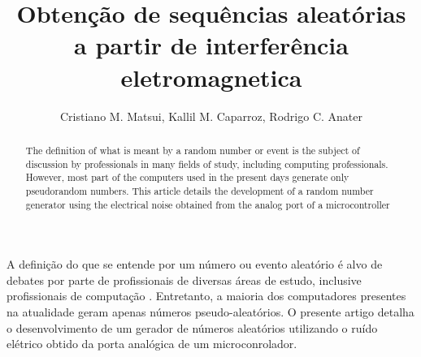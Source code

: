 \documentclass[
12pt,				%
openright,			%
twoside,			%
a4paper,			%
sumario=tradicional, %
hidelinks,          %
num,				%
bibjustif,			%
brackets,			%
english,			%
brazil				%
]{article}       %
\title{Obtenção de sequências aleatórias a partir de interferência eletromagnetica}
\author{Cristiano M. Matsui\inst{1}, Kallil M. Caparroz\inst{2}, Rodrigo C. Anater\inst{3} }
\begin{document}
 

  \maketitle

\begin{abstract} 	
 	The definition of what is meant by a random number or event is the subject of discussion by professionals in many fields of study, including computing professionals. However, most part of the computers used in the present days generate only pseudorandom numbers. This article details the development of a random number generator using the electrical noise obtained from the analog port of a microcontroller
\end{abstract}
     
\begin{resumo} 
 	A definição do que se entende por um número ou evento aleatório é alvo de debates por parte de profissionais de diversas áreas de estudo, inclusive profissionais de computação \cite{volchan2001algorithmic}. Entretanto, a maioria dos computadores presentes na atualidade geram apenas números pseudo-aleatórios. O presente artigo detalha o desenvolvimento de um gerador de números aleatórios utilizando o ruído elétrico obtido da porta analógica de um microconrolador.  
\end{resumo}





 


\nocite{park1988random}


\end{document}
